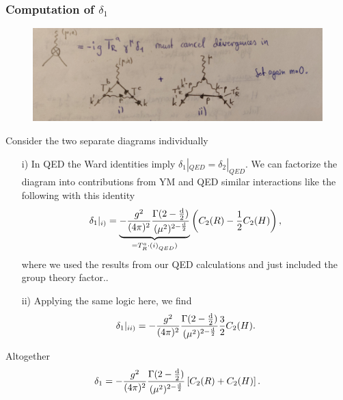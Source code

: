 \subsubsection{Computation of $\delta_1$}
\begin{figure}[h!]
	\centering
	\includegraphics[width=0.7\linewidth]{gfx/YMpictures/YMoneLoopDeltaOne}
	\caption{}
	\label{fig:ymoneloopdeltaone}
\end{figure}
Consider the two separate diagrams individually
\begin{enumerate}
	\item[i)] In QED the Ward identities imply $\delta_1 |_{QED} = \delta_2|_{QED}$. We can factorize the diagram into contributions from YM and QED similar interactions like the following with this identity
	\begin{equation}
	\delta_1 |_{i)} = \underbrace{- \frac{g^2}{(4 \pi)^2} \frac{\Gamma(2-\frac{\mathrm{d}}{2})}{(\mu^2)^{2-\frac{\mathrm{d}}{2}} }}_{= T^a_R \cdot ({i)}_{QED})} \left(C_2(R)-\frac{1}{2} C_2(H)\right),
	\end{equation}
	where we used the results from our QED calculations and just included the group theory factor..
	\item[ii)] Applying the same logic here, we find
	\begin{equation}
	\delta_1 |_{ii)} = -\frac{g^2}{(4 \pi)^2} \frac{\Gamma(2-\frac{\mathrm{d}}{2})}{(\mu^2)^{2-\frac{\mathrm{d}}{2}} } \frac{3}{2} C_2(H).
	\end{equation}
\end{enumerate}
Altogether
\begin{equation}
\delta_1 = - \frac{g^2}{(4 \pi)^2} \frac{\Gamma(2-\frac{\mathrm{d}}{2})}{(\mu^2)^{2-\frac{\mathrm{d}}{2}}} \left[C_2(R)+C_2(H)\right].
\end{equation}

